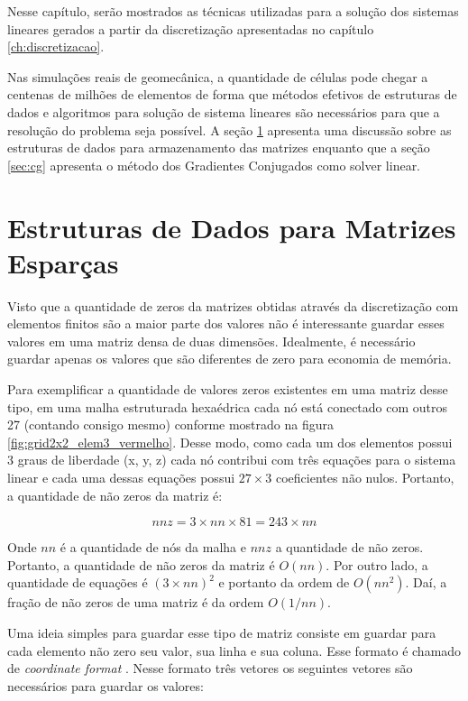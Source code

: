 

Nesse capítulo, serão mostrados as técnicas utilizadas para a solução dos sistemas lineares gerados a partir da discretização apresentadas no capítulo \ref{ch:discretizacao}.


Nas simulações reais de geomecânica, a quantidade de células pode chegar a centenas de milhões de elementos de forma que métodos efetivos de estruturas de dados e algoritmos para solução de sistema lineares são necessários para que a resolução do problema seja possível. A seção \ref{sec:csr} apresenta uma discussão sobre as estruturas de dados para armazenamento das matrizes enquanto que a seção \ref{sec:cg} apresenta o método dos Gradientes Conjugados como solver linear.


\section{Estruturas de Dados para Matrizes Esparças} \label{sec:csr}


Visto que a quantidade de zeros da matrizes obtidas através da discretização com elementos finitos são a maior parte dos valores não é interessante guardar esses valores em uma matriz densa de duas dimensões. Idealmente, é necessário guardar apenas os valores que são diferentes de zero para economia de memória.

Para exemplificar a quantidade de valores zeros existentes em uma matriz desse tipo, em uma malha estruturada hexaédrica cada nó está conectado com outros 27 (contando consigo mesmo) conforme mostrado na figura \ref{fig:grid2x2_elem3_vermelho}. Desse modo, como cada um dos elementos possui 3 graus de liberdade (x, y, z) cada nó contribui com três equações para o sistema linear e cada uma dessas equações possui $27\times3$ coeficientes não nulos.
Portanto, a quantidade de não zeros da matriz é:

\begin{equation}
    nnz = 3 \times nn \times 81 = 243 \times nn
\end{equation}

Onde $nn$ é a quantidade de nós da malha e $nnz$ a quantidade de não zeros. Portanto, a quantidade de não zeros da matriz é $O(nn)$. Por outro lado, a quantidade de equações é $(3\times nn)^2 $ e portanto da ordem de $O(nn^2)$. Daí, a fração de não zeros de uma matriz é da ordem $O(1/nn)$.


Uma ideia simples para guardar esse tipo de matriz consiste em guardar para cada elemento não zero seu valor, sua linha e sua coluna. Esse formato é chamado de \textit{coordinate format} \cite{solverlinear}. Nesse formato três vetores os seguintes vetores são necessários para guardar os valores:

